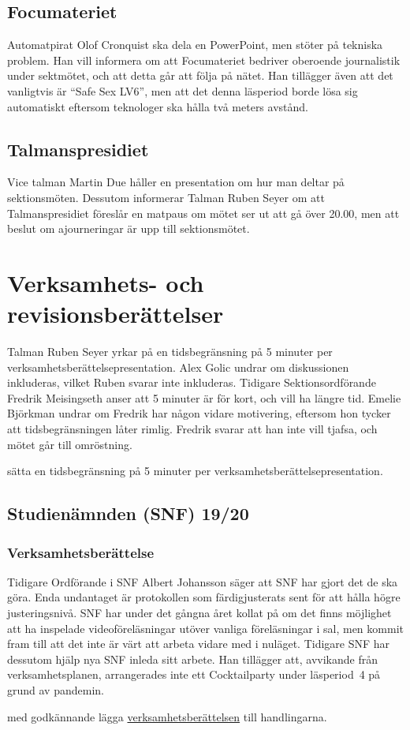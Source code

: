 \documentclass[hidelinks]{../sektionsmote} %
\begin{document}
\subsection{Focumateriet}
Automatpirat Olof Cronquist ska dela en PowerPoint, men stöter på tekniska problem.
Han vill informera om att Focumateriet bedriver oberoende journalistik under sektmötet, och att detta går att följa på nätet.
Han tillägger även att det vanligtvis är \enquote{Safe Sex LV6}, men att det denna läsperiod borde lösa sig automatiskt eftersom teknologer ska hålla två meters avstånd.

\subsection{Talmanspresidiet}
Vice talman Martin Due håller en presentation om hur man deltar på sektionsmöten.
Dessutom informerar Talman Ruben Seyer om att Talmanspresidiet föreslår en matpaus om mötet ser ut att gå över 20.00, men att beslut om ajourneringar är upp till sektionsmötet.


\section{Verksamhets- och revisionsberättelser}
Talman Ruben Seyer yrkar på en tidsbegränsning på 5 minuter per verksamhetsberättelsepresentation.
Alex Golic undrar om diskussionen inkluderas, vilket Ruben svarar inte inkluderas.
Tidigare Sektionsordförande Fredrik Meisingseth anser att 5 minuter är för kort, och vill ha längre tid.
Emelie Björkman undrar om Fredrik har någon vidare motivering, eftersom hon tycker att tidsbegränsningen låter rimlig.
Fredrik svarar att han inte vill tjafsa, och mötet går till omröstning.
\begin{beslut}
    \item sätta en tidsbegränsning på 5 minuter per verksamhetsberättelsepresentation.
\end{beslut}

\subsection{Studienämnden (SNF) 19/20}

\subsubsection{Verksamhetsberättelse}
Tidigare Ordförande i SNF Albert Johansson säger att SNF har gjort det de ska göra.
Enda undantaget är protokollen som färdigjusterats sent för att hålla högre justeringsnivå.
SNF har under det gångna året kollat på om det finns möjlighet att ha inspelade videoföreläsningar utöver vanliga föreläsningar i sal, men kommit fram till att det inte är värt att arbeta vidare med i nuläget.
Tidigare SNF har dessutom hjälp nya SNF inleda sitt arbete.
Han tillägger att, avvikande från verksamhetsplanen, arrangerades inte ett Cocktailparty under läsperiod~4 på grund av pandemin.
\begin{beslut}
    \item med godkännande lägga \hyperlink{bilagor/snf/vb.pdf.1}{verksamhetsberättelsen} till handlingarna.
\end{beslut}
\end{document}
